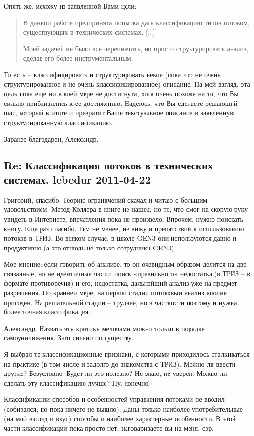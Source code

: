 \documentclass[a4paper,11pt]{article}
\begin{document}
Опять же, исхожу из заявленной Вами цели:
\begin{quote}
  В данной работе предпринята попытка дать классификацию типов потоком,
  существующих в технических системах.  [...]
  
  Моей задачей не было все переиначить, но просто структурировать анализ,
  сделав его более инструментальным.
\end{quote}
То есть -- классифицировать и структурировать некое (пока что не очень
структурированное и не очень классифицированное) описание. На мой взгляд, эта
цель пока еще ни в коей мере не достигнута, хотя очень похоже на то, что Вы
сильно приблизились к ее достижению. Надеюсь, что Вы сделаете решающий шаг,
который в итоге и превратит Ваше текстуальное описание в заявленную
структурированную классификацию.

Заранее благодарен, Александр.

\subsection*{Re: Классификация потоков в технических системах.  lebedur
  2011-04-22} 

Григорий, спасибо. Теорию ограничений скачал и читаю с большим удовольствием.
Метод Коллера в книге не нашел, но то, что смог на скорую руку увидеть в
Интернете, впечатления пока не произвело. Впрочем, нужно поискать книгу. Еще
раз спасибо. Тем не менее, не вижу и препятствий к использованию потоков в
ТРИЗ. Во всяком случае, в школе GEN3 они используются давно и продуктивно (а
это отнюдь не только сотрудники GEN3).

Мое мнение: если говорить об анализе, то он очевидным образом делится на две
связанные, но не идентичные части: поиск «правильного» недостатка (в ТРИЗ – в
формате противоречия) и его, недостатка, дальнейший анализ уже на предмет
разрешения. По крайней мере, на первой стадии потоковый анализ вполне
пригоден. На решательной стадии – труднее, но в частности поэтому и нужна
более точная классификация.

Александр.  Назвать эту критику мелочами можно только в порядке
самоуничижения. Зато сильно по существу.

Я выбрал те классификационные признаки, с которыми приходилось сталкиваться на
практике (в том числе и задолго до знакомства с ТРИЗ). Можно ли ввести другие?
Безусловно. Будет ли это полезно? Не знаю, не уверен.  Можно ли сделать эту
классификацию лучше? Ну, конечно!

Классификации способов и особенностей управления потоками не вводил
(собирался, но пока ничего не вышло). Даны только наиболее употребительные (на
мой взгляд и вкус) способы и наиболее характерные особенности. В этой части
классификации пока просто нет, наговариваете вы на меня, сэр.
\end{document}
